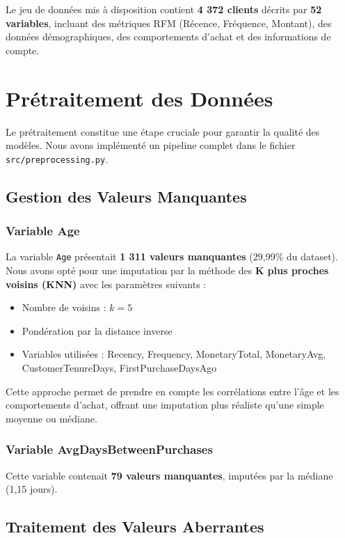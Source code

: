 \documentclass[11pt,a4paper]{article}
\begin{document}
Le jeu de données mis à disposition contient \textbf{4 372 clients} décrits par \textbf{52 variables}, incluant des métriques RFM (Récence, Fréquence, Montant), des données démographiques, des comportements d'achat et des informations de compte.

\section{Prétraitement des Données}

Le prétraitement constitue une étape cruciale pour garantir la qualité des modèles. Nous avons implémenté un pipeline complet dans le fichier \texttt{src/preprocessing.py}.

\subsection{Gestion des Valeurs Manquantes}

\subsubsection{Variable Age}
La variable \texttt{Age} présentait \textbf{1 311 valeurs manquantes} (29,99\% du dataset). Nous avons opté pour une imputation par la méthode des \textbf{K plus proches voisins (KNN)} avec les paramètres suivants :
\begin{itemize}
    \item Nombre de voisins : $k = 5$
    \item Pondération par la distance inverse
    \item Variables utilisées : Recency, Frequency, MonetaryTotal, MonetaryAvg, CustomerTenureDays, FirstPurchaseDaysAgo
\end{itemize}

Cette approche permet de prendre en compte les corrélations entre l'âge et les comportements d'achat, offrant une imputation plus réaliste qu'une simple moyenne ou médiane.

\subsubsection{Variable AvgDaysBetweenPurchases}
Cette variable contenait \textbf{79 valeurs manquantes}, imputées par la médiane (1,15 jours).

\subsection{Traitement des Valeurs Aberrantes}
\end{document}
